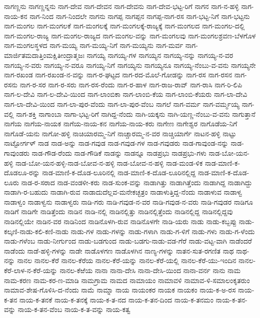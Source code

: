 {ನಾಗಣ್ಣನು
ನಾಗಣ್ಣನ್ನನು
ನಾಗ-ದೇವ
ನಾಗ-ದೇವನ
ನಾಗ-ದೇವನು
ನಾಗ-ದೇವ-ಭಟ್ಟ-ರಿಗೆ
ನಾಗನ
ನಾಗ-ನ-ಹಳ್ಳಿ
ನಾಗ-ನಾಯ-ಕನ
ನಾಗ-ನಿಂದ
ನಾಗ-ನಿಂದಲೇ
ನಾಗನು
ನಾಗಪ್ಪ
ನಾಗಪ್ಪನ
ನಾಗಪ್ಪ-ನಾಗ-ರಸ
ನಾಗ-ಭಟ್ಟ-ನಿಗೆ
ನಾಗ-ಭಟ್ಟನು
ನಾಗ-ಮಂಗಲ
ನಾಗ-ಮಂಗಲಕೆ
ನಾಗ-ಮಂಗಲಕ್ಕೆ
ನಾಗ-ಮಂಗಲಕ್ಕೆ-ರಾಜ್ಯಕ್ಕೆ
ನಾಗ-ಮಂಗಲದ
ನಾಗ-ಮಂಗಲ-ದಲ್ಲಿ
ನಾಗ-ಮಂಗಲ-ರಾಜ್ಯ
ನಾಗ-ಮಂಗಲ-ರಾಜ್ಯದ
ನಾಗ-ಮಂಗಲ-ವನ್ನು
ನಾಗ-ಮಂಗಲವು
ನಾಗ-ಮಂಗಲಶ್ರವಣ-ಬೆಳಗೊಳ
ನಾಗ-ಮಂಗಲಸ್ಥಳದ
ನಾಗ-ಮಯ್ಯ
ನಾಗ-ಮಯ್ಯ-ನಿಗೆ
ನಾಗ-ಮಯ್ಯನು
ನಾಗ-ಮರ್ವ
ನಾಗ-ಮಾರ್ಜಿತಮದಾತ್ತಿಂಮಕ್ಷಿತೀಂದ್ರಾತ್ಮಜಃ
ನಾಗಯ್ಯ
ನಾಗಯ್ಯ-ಗಳ
ನಾಗಯ್ಯನ
ನಾಗಯ್ಯ-ನನ್ನು
ನಾಗಯ್ಯ-ನ-ವರ
ನಾಗಯ್ಯ-ನ-ವರು
ನಾಗಯ್ಯ-ನ-ವರೂ
ನಾಗಯ್ಯ-ನಿಗೆ
ನಾಗಯ್ಯನು
ನಾಗಯ್ಯನೂ
ನಾಗಯ್ಯ-ನೆಂಬು-ವ-ವನು
ನಾಗಯ್ಯನೇ
ನಾಗ-ರಖಂಡ
ನಾಗ-ರಖಂಡ-ನ-ವನ್ನು
ನಾಗ-ರ-ಘಟ್ಟದ
ನಾಗ-ರದ-ಮೊಲೆ-ಗೋಡನ್ನು
ನಾಗ-ರಸ
ನಾಗ-ರಸನ
ನಾಗ-ರಸನು
ನಾಗ-ರ-ಸರ
ನಾಗ-ರ-ಸರು
ನಾಗ-ರಸ-ರೆಂದು
ನಾಗ-ರ-ಹಾಳ
ನಾಗ-ರಾಜ-ರಾವ್
ನಾಗ-ರಾಸಿ
ನಾಗ-ರಿ-ಲಿಪಿ
ನಾಗ-ಲ-ದೇವಿ
ನಾಗ-ಲ-ದೇವಿ-ಯಿಂದ
ನಾಗ-ಲಾಂಬಿಕಾ
ನಾಗ-ಲಾಂಬಿ-ಕೆಯ
ನಾಗ-ಲಾಂಬಿ-ಕೆಯರು
ನಾಗ-ಲಾ-ದೇವಿ
ನಾಗ-ಲಾ-ದೇವಿ-ಯಿಂದ
ನಾಗ-ಲಾ-ಪುರ-ವೆಂದು
ನಾಗ-ಲಾ-ಪುರ-ವೆಂಬ
ನಾಗಲೆ
ನಾಗ-ವರ್ಮ
ನಾಗ-ವರ್ಮ್ಮಯ್ಯ
ನಾಗ-ವಲ್ಲಿ
ನಾಗ-ಶಕ್ತಿ
ನಾಗಾಂಬಾ
ನಾಗಾ-ಭಟ್ಟ-ರಿಗೆ
ನಾಗಿದ್ದ-ನೆಂದು
ನಾಗಿ-ಯಕ್ಕನು
ನಾಗಿ-ಯಣ್ಣ-ನೆಂಬು-ವ-ವನು
ನಾಗುತ್ತಾನೆ
ನಾಗೆಯ
ನಾಗೆಯ-ನಾಯಕ
ನಾಗೆಯ-ನಾಯ-ಕನ
ನಾಗೆಯ-ನಾಯ-ಕರು
ನಾಗೇಣ
ನಾಗೇಶ್ವರ
ನಾಗೊಡೆಯ-ನಿಗೆ
ನಾಗೊಡೆ-ಯನು
ನಾಗೋ-ಹಳ್ಳಿ
ನಾಚಿಯಾರಮ್ಮ-ನಿಗೆ
ನಾಚ್ಚಾರಮ್ಮ-ನ-ವರ
ನಾಚ್ಚಿಯಾರ್ಗೆ
ನಾಟನ-ಹಳ್ಳಿ
ನಾಟ್ಟು
ನಾಟ್ಟೋರ್ಗಳ್
ನಾಡ
ನಾಡ-ಅನ್ನು
ನಾಡ-ಗವುಡ
ನಾಡ-ಗವುಡ-ಗಳ
ನಾಡ-ಗವುಡರು
ನಾಡ-ಗಾವುಂಡ-ನನ್ನು
ನಾಡ-ಗಾವುಂಡರು
ನಾಡ-ಗೌಡ-ರೆಂದು
ನಾಡ-ಗೌಡಿಕೆ
ನಾಡನ್ನು
ನಾಡನ್ನೂ
ನಾಡಪ್ರಭು
ನಾಡಪ್ರಭು-ಗಳು
ನಾಡ-ಬೋ-ಯನ-ಹಳ್ಳಿ
ನಾಡ-ಬೋ-ಯನ-ಹಳ್ಳಿ-ನಾಡ-ಬೋವ-ನ-ಹಳ್ಳಿ
ನಾಡ-ಬೋವ-ನ-ಹಳ್ಳಿ
ನಾಡ-ಮಂಡ-ಳಿಕ
ನಾಡ-ಮಾಣಿ-ಕ-ದೊಡಲೂ-ರನ್ನು
ನಾಡ-ಮಾಣಿ-ಕ-ದೊಡ-ಲೂರಿನಲ್ಲಿ
ನಾಡ-ಮಾಣಿ-ಕ-ದೊಡ-ಲೂರಿನಲ್ಲಿದ್ದ
ನಾಡ-ಮಾಣಿ-ಕ-ದೊಡ-ಲೂರು
ನಾಡ-ರ-ಸರಾದ
ನಾಡ-ವಂಡಳೀ-ಕರು
ನಾಡ-ಸುಂಕ-ವನ್ನು
ನಾಡಾಗಿತ್ತು
ನಾಡಾಗಿತ್ತೆಂದು
ನಾಡಾಗಿದ್ದ
ನಾಡಾಗಿದ್ದು
ನಾಡಾಗಿ-ರ-ಬಹುದು
ನಾಡಾಗಿ-ರುವ
ನಾಡಾದುದೆಲ್ಲವ-ಮನೇಕಚ್ಛತ್ರಂ
ನಾಡಾಳುತ್ತಿದ್ದ-ನೆಂದು
ನಾಡಾಳುವ
ನಾಡಾಳ್ವ
ನಾಡಾಳ್ವಂ
ನಾಡಾಳ್ವನು
ನಾಡಾಳ್ವರು
ನಾಡಿ-ಗರು
ನಾಡಿ-ಗವುಡ-ನ-ವರ
ನಾಡಿ-ಗವುಡ-ನ-ವರು
ನಾಡಿ-ಗವುಡರ
ನಾಡಿಗೂ
ನಾಡಿಗೆ
ನಾಡಿಗೇ
ನಾಡಿತ್ತೆಂದು
ನಾಡಿನ
ನಾಡಿ-ನಲ್ಲಿ
ನಾಡಿನಲ್ಲಿತ್ತು
ನಾಡಿನಲ್ಲಿತ್ತೆಂದು
ನಾಡಿನಲ್ಲಿದ್ದ
ನಾಡಿನಲ್ಲಿದ್ದವು
ನಾಡಿನಲ್ಲಿಯೇ
ನಾಡಿನ-ವರ
ನಾಡಿನಿಂದ
ನಾಡಿನೊಳಗಿ-ರುವ
ನಾಡಿನೊಳಗೇ
ನಾಡಿ-ಯರು
ನಾಡು
ನಾಡು-ಕಬ್ಬಪ್ಪು
ನಾಡು-ಕಲ್ಕಣಿ-ನಾಡು-ಕಲಿ-ಕಣಿ-ನಾಡು
ನಾಡು-ಗಳ
ನಾಡು-ಗಳನ್ನು
ನಾಡು-ಗಳಾಗಿ
ನಾಡು-ಗ-ಳಿಗೆ
ನಾಡು-ಗಳು
ನಾಡು-ಗ-ಳೆಂದು
ನಾಡು-ಗಳೆಂಬ
ನಾಡು-ನೀರ್ಗುಂದ
ನಾಡು-ಬಡಗುಂದ
ನಾಡು-ಬಡಗು-ನಾಡು-ವಡ-ಗೆರೆ
ನಾಡು-ವಟ್ಟ-ವಾಗಿ
ನಾಡೆಂದರೆ
ನಾಡೆಂದು
ನಾಡೆ-ಹಳ್ಳಿ-ಗಳನ್ನು
ನಾಡೇ
ನಾಡೊಳಗಣ
ನಾಡೊಳಗಿನ
ನಾಣ್ಯ-ಗಳನ್ನು
ನಾತನ-ಸುತ-ರಗಣಿತ
ನಾಥ
ನಾಥ-ನನ್ನು
ನಾನಲ
ನಾನಲ-ಕೆರೆ
ನಾನಲ-ಕೆರೆಯ
ನಾನಲ-ಕೆರೆ-ಯನ್ನು
ನಾನಲ-ಕೆರೆ-ಯಲ್ಲಿ
ನಾನಲ-ಕೆರೆ-ಯು-ಇಂದಿನ
ನಾನಲ-ಕೆರೆ-ಲಾಳ-ನ-ಕೆರೆ-ಯನ್ನು
ನಾನಲ-ಕೆಱೆಯ
ನಾನಾ
ನಾನಾ-ದೇಸಿ
ನಾನಾ-ದೇಸಿ-ಯಿಂದ
ನಾನಾ-ವರ್ನ
ನಾನು
ನಾಮ
ನಾಮ-ಕರಣ
ನಾಮ-ಕರ-ಣ-ಮಾಡಿ
ನಾಮಗ್ರಾಮ
ನಾಮದ
ನಾಮಾಯಂ
ನಾಮಾವಳಿ
ನಾಮಾವ-ಳಿ-ಸಮಾಲಂಕೃತರುಂ
ನಾಮಾವ-ಶೇಷ-ಗೊಳಿಸಿ-ದ-ನೆಂದು
ನಾಮೆ
ನಾಮ್ನಾ
ನಾಯ
ನಾಯಂಕರ
ನಾಯಕ
ನಾಯಕಂ
ನಾಯ-ಕ-ಅ-ರಸ
ನಾಯ-ಕ-ತನ
ನಾಯ-ಕ-ತನಕೆ
ನಾಯ-ಕ-ತನಕ್ಕೆ
ನಾಯ-ಕ-ತ-ನದ
ನಾಯ-ಕ-ತನ-ದಿಂದ
ನಾಯ-ಕ-ತನಮಂ
ನಾಯ-ಕ-ತನ-ವನ್ನು
ನಾಯ-ಕ-ತನ-ವೆಂಬ
ನಾಯ-ಕ-ತ-ವನ್ನು
ನಾಯ-ಕತ್ವ
}
